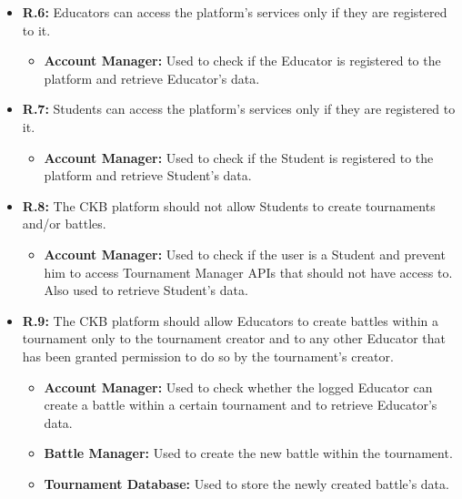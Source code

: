 \documentclass{article}
\begin{document}
{\begin{itemize}
          \begin{itemize}
              \item \textbf{Account Manager:} Used to check if the Educator has already
              registered to the platform and retrieve Educator's data.
          \end{itemize}
    \item \textbf{R.6:} Educators can access the platform's services only if they are registered to it.
          \begin{itemize}
              \item \textbf{Account Manager:} Used to check if the Educator is registered to
              the platform and retrieve Educator's data.
          \end{itemize}
    \item \textbf{R.7:} Students can access the platform's services only if they are registered to it.
          \begin{itemize}
            \item \textbf{Account Manager:} Used to check if the Student is registered to
            the platform and retrieve Student's data.
          \end{itemize}
    \item \textbf{R.8:} The CKB platform should not allow Students to create tournaments and/or battles.
          \begin{itemize}
              \item \textbf{Account Manager:} Used to check if the user is a Student and prevent him
              to access Tournament Manager APIs that should not have access to. Also used to 
              retrieve Student's data.
          \end{itemize}
    \item \textbf{R.9:} The CKB platform should allow Educators to create battles within a tournament only to the tournament
          creator and to any other Educator that has been granted permission to do so by the tournament's creator.
          \begin{itemize}
              \item \textbf{Account Manager:} Used to check whether the logged Educator can create
              a battle within a certain tournament and to retrieve Educator's data.
              \item \textbf{Battle Manager:} Used to create the new battle within the tournament.
              \item \textbf{Tournament Database:} Used to store the newly created battle's data.

\end{itemize}
\end{itemize}}
\end{document}
